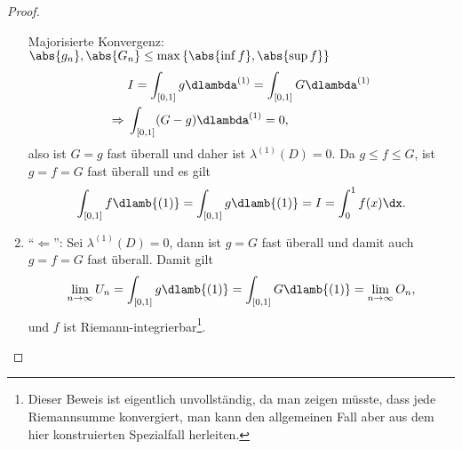 \begin{proof}
\begin{enumerate}[label=\arabic{*}.)]
Majorisierte Konvergenz: $\abs{g_n},\abs{G_n} \le \max\left\{ \abs{\inf f},
\abs{\sup f} \right\}$
\begin{align*}
&I = \int_{[0,1]} g\dlambda^{(1)} = \int_{[0,1]} G\dlambda^{(1)}\\
\Rightarrow\;& \int_{[0,1]} (G-g)\dlambda^{(1)} = 0,
\end{align*}
also ist $G=g$ fast überall und daher ist $\lambda^{(1)}(D) = 0$. Da $g\le
f\le G$, ist $g=f=G$ fast überall und es gilt
\begin{align*}
\int_{[0,1]} f\dlamb{(1)} = \int_{[0,1]} g\dlamb{(1)} = I = \int_0^1 f(x)\dx. 
\end{align*}
\item ``$\Leftarrow$'': Sei $\lambda^{(1)}(D) = 0$, dann ist $g=G$ fast überall
und damit auch $g=f=G$ fast überall. Damit gilt
\begin{align*}
\lim\limits_{n\to\infty} U_n = \int_{[0,1]} g\dlamb{(1)} = \int_{[0,1]}
G\dlamb{(1)} = \lim\limits_{n\to\infty} O_n,
\end{align*}
und $f$ ist Riemann-integrierbar\footnote{Dieser Beweis ist eigentlich
unvollständig, da man zeigen müsste, dass jede Riemannsumme konvergiert, man
kann den allgemeinen Fall aber aus dem hier konstruierten Spezialfall
herleiten.}.
\end{enumerate}
\end{proof}

